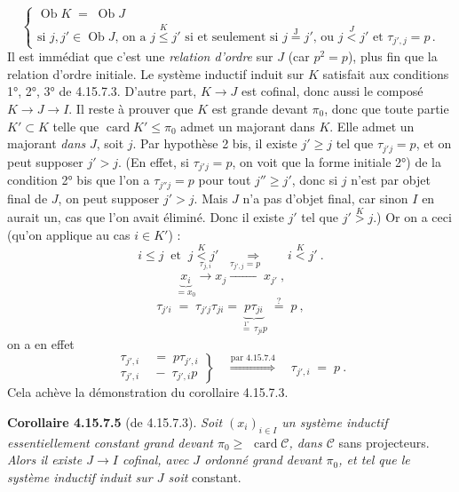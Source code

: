 \documentclass[11pt]{article}
\newcommand{\printedpage}[1]{\marginpar{\footnotesize p.~#1}}
\newcommand{\msp}[1]{\marginpar{\footnotesize [#1]}}
\newcommand{\cC}{\mathcal{C}}
\newcommand{\Ob}{\operatorname{Ob}}
\newcommand{\card}{\operatorname{card}}
\begin{document}
\msp{page 447}
\[
\begin{cases}
\Ob K \;=\; \Ob J \\
\text{si } j,j' \in \Ob J\text{, on a } j \overset{K}{\leqslant} j' \text{ si et seulement si } j \overset{\mathrm{J}}{=} j'\text{, ou } j \overset{J}{<} j' \text{ et } \tau_{j',j} = p\,.
\end{cases}
\]
Il est immédiat que c'est une \textit{relation d'ordre} sur $J$ (car $p^2 = p$), plus fin que la relation d'ordre initiale. Le système inductif induit sur $K$ satisfait aux conditions 1°, 2°, 3° de 4.15.7.3. D'autre part, $K \longrightarrow J$ est cofinal, donc aussi le composé $K \longrightarrow J \longrightarrow I$. Il reste à prouver que $K$ est grande devant $\pi_0$, donc que toute partie $K' \subset K$ telle que $\card K' \leqslant \pi_0$ admet un majorant dans $K$. Elle admet un majorant \textit{dans} $J$, soit $j$. Par hypothèse 2 bis, il existe $j' \geqslant j$ tel que $\tau_{j'j} = p$, et on peut supposer $j' > j$. (En effet, si $\tau_{j'j} = p$, on voit que
\printedpage{172}
\msp{page 448}
la forme initiale 2°) de la condition 2° bis que l'on a $\tau_{j''j} = p$ pour tout $j'' \geqslant j'$, donc si $j$ n'est par objet final de $J$, %
on peut supposer $j' > j$. Mais $J$ n'a pas d'objet final, car sinon $I$ en aurait un, cas que l'on avait éliminé. Donc il existe $j'$ tel que $j' \overset{K}{>} j$.) Or on a ceci (qu'on applique au cas $i \in K'$) :
\[
i \leqslant j \ \text{ et } \ j \overset{K}{<} j' \qquad \Longrightarrow \qquad i \overset{K}{<} j'\ .
\]
\[
\underbrace{x_i}_{= x_0} \xrightarrow{\tau_{j,i}} x_j \xrightarrow{\tau_{j',j}=p} x_{j'}\ ,
\]
\[
\tau_{j'i} \;=\; \tau_{j'j}\tau_{ji} = \underbrace{p\tau_{ji}}_{\overset{\text{1°}}{=}\,\tau_{ji}p} \;\overset{?}{=}\; p\ ,
\]
on a en effet
\[
\left.
\begin{aligned}
\tau_{j',i} &\;=\; p\tau_{j',i} \\
\tau_{j',i} &\;-\; \tau_{j',i}p %
\end{aligned}
\right\}
\quad \overset{\text{par 4.15.7.4}}{\Longrightarrow} \quad %
\tau_{j',i} \;=\; p\ .
\]
Cela achève la démonstration du corollaire 4.15.7.3.

\textbf{Corollaire 4.15.7.5} (de 4.15.7.3). \textit{Soit $(x_i)_{i\in I}$ un système inductif essentiellement constant grand devant $\pi_0 \geqslant$} $\card\cC$\textit{, dans $\cC$} sans projecteurs. \textit{Alors il existe $J \longrightarrow I$ cofinal, avec $J$ ordonné grand devant $\pi_0$, et tel que le système inductif induit sur $J$ soit} constant.
\end{document}
